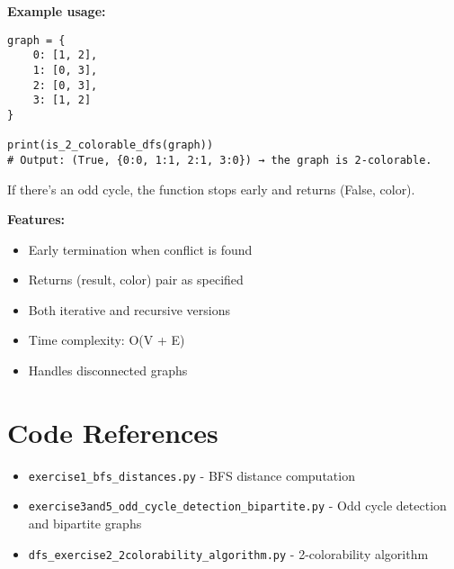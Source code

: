 \documentclass[12pt,a4paper]{article}
\begin{document}
\textbf{Example usage:}
\begin{lstlisting}[caption=Example Usage, label=lst:example_usage]
graph = {
    0: [1, 2],
    1: [0, 3],
    2: [0, 3],
    3: [1, 2]
}

print(is_2_colorable_dfs(graph))
# Output: (True, {0:0, 1:1, 2:1, 3:0}) → the graph is 2-colorable.
\end{lstlisting}

If there's an odd cycle, the function stops early and returns (False, color).

\textbf{Features:}
\begin{itemize}
\item Early termination when conflict is found
\item Returns (result, color) pair as specified
\item Both iterative and recursive versions
\item Time complexity: O(V + E)
\item Handles disconnected graphs
\end{itemize}



\section{Code References}

\begin{itemize}
    \item \texttt{exercise1\_bfs\_distances.py} - BFS distance computation
    \item \texttt{exercise3and5\_odd\_cycle\_detection\_bipartite.py} - Odd cycle detection and bipartite graphs
    \item \texttt{dfs\_exercise2\_2colorability\_algorithm.py} - 2-colorability algorithm
\end{itemize}
\end{document}
